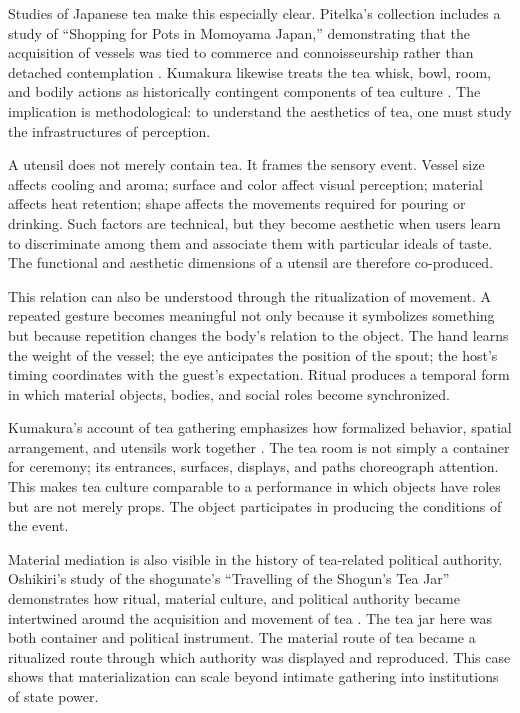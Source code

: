 \documentclass[numbers]{IntechOpen-Book}
\begin{document}
Studies of Japanese tea make this especially clear. Pitelka's collection includes a study of ``Shopping for Pots in Momoyama Japan,'' demonstrating that the acquisition of vessels was tied to commerce and connoisseurship rather than detached contemplation \cite{pitelka2013}. Kumakura likewise treats the tea whisk, bowl, room, and bodily actions as historically contingent components of tea culture \cite{kumakura2023}. The implication is methodological: to understand the aesthetics of tea, one must study the infrastructures of perception.

A utensil does not merely contain tea. It frames the sensory event. Vessel size affects cooling and aroma; surface and color affect visual perception; material affects heat retention; shape affects the movements required for pouring or drinking. Such factors are technical, but they become aesthetic when users learn to discriminate among them and associate them with particular ideals of taste. The functional and aesthetic dimensions of a utensil are therefore co-produced.

This relation can also be understood through the ritualization of movement. A repeated gesture becomes meaningful not only because it symbolizes something but because repetition changes the body's relation to the object. The hand learns the weight of the vessel; the eye anticipates the position of the spout; the host's timing coordinates with the guest's expectation. Ritual produces a temporal form in which material objects, bodies, and social roles become synchronized.

Kumakura's account of tea gathering emphasizes how formalized behavior, spatial arrangement, and utensils work together \cite{kumakura2023}. The tea room is not simply a container for ceremony; its entrances, surfaces, displays, and paths choreograph attention. This makes tea culture comparable to a performance in which objects have roles but are not merely props. The object participates in producing the conditions of the event.

Material mediation is also visible in the history of tea-related political authority. Oshikiri's study of the shogunate's ``Travelling of the Shogun's Tea Jar'' demonstrates how ritual, material culture, and political authority became intertwined around the acquisition and movement of tea \cite{oshikiri2016}. The tea jar here was both container and political instrument. The material route of tea became a ritualized route through which authority was displayed and reproduced. This case shows that materialization can scale beyond intimate gathering into institutions of state power.
\end{document}
